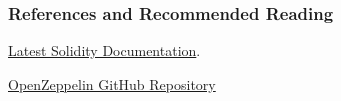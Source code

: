 \documentclass[]{beamer}
\begin{document}


\begin{frame}%
\frametitle{References and Recommended Reading}

 
\link \href{https://docs.soliditylang.org/en/latest/index.html}{Latest Solidity Documentation}.

\vspace{1em}

\link \href{https://github.com/OpenZeppelin/openzeppelin-contracts}{OpenZeppelin GitHub Repository}

\end{frame}
\end{document}
